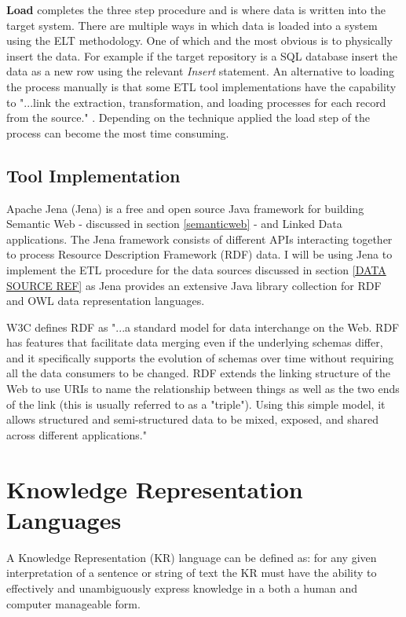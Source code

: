 \textbf{Load} completes the three step procedure and is where data is written into the target system. There are multiple ways in which data is loaded into a system using the ELT methodology. One of which and the most obvious is to physically insert the data. For example if the target repository is a SQL database insert the data as a new row using the relevant \textit{Insert} statement. An alternative to loading the process manually is that some ETL tool implementations have the capability to "...link the extraction, transformation, and loading processes for each record from the source." \cite{etlref2}. Depending on the technique applied the load step of the process can become the most time consuming.

\subsection{Tool Implementation}\label{etltool}

Apache Jena (Jena) is a free and open source Java framework for building Semantic Web - discussed in section \ref{semanticweb} - and Linked Data applications. \cite{jena} The Jena framework consists of different APIs interacting together to process Resource Description Framework (RDF) data. I will be using Jena to implement the ETL procedure for the data sources discussed in section \ref{DATA SOURCE REF} as Jena provides an extensive Java library collection for RDF and OWL data representation languages.

W3C defines RDF as "...a standard model for data interchange on the Web. RDF has features that facilitate data merging even if the underlying schemas differ, and it specifically supports the evolution of schemas over time without requiring all the data consumers to be changed. RDF extends the linking structure of the Web to use URIs to name the relationship between things as well as the two ends of the link (this is usually referred to as a "triple"). Using this simple model, it allows structured and semi-structured data to be mixed, exposed, and shared across different applications." \cite{rdf}

\section{Knowledge Representation Languages}
A Knowledge Representation (KR) language can be defined as: for any given interpretation of a sentence or string of text the KR must have the ability to effectively and unambiguously express knowledge in a both a human and computer manageable form. 

